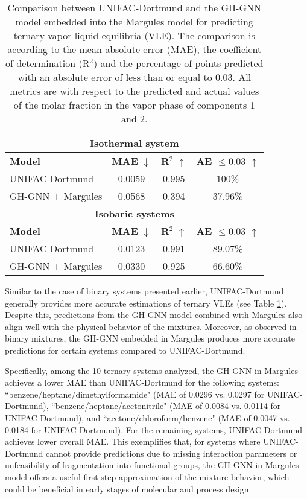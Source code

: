 \begin{table}[h]
\centering
  \caption{Comparison between UNIFAC-Dortmund and the GH-GNN model embedded into the Margules model for predicting ternary vapor-liquid equilibria (VLE). The comparison is according to the mean absolute error (MAE), the coefficient of determination (R$^2$) and the percentage of points predicted with an absolute error of less than or equal to 0.03. All metrics are with respect to the predicted and actual values of the molar fraction in the vapor phase of components 1 and 2.}
  \label{tbl:ternary}
  \small
  \begin{tabular*}{1\textwidth}{@{\extracolsep{\fill}}lccc}
    \hline
    \multicolumn{4}{c}{\textbf{Isothermal system}}\\
    \hline
    \textbf{Model} & \textbf{MAE} $\downarrow$ & \textbf{R$^2$} $\uparrow$ & \textbf{AE $\leq 0.03$} $\uparrow$ \\
    \hline
    UNIFAC-Dortmund & 0.0059 & 0.995 & 100\% \\
    GH-GNN + Margules & 0.0568 & 0.394 & 37.96\% \\
    \hline
    \multicolumn{4}{c}{\textbf{Isobaric systems}}\\
    \hline
    \textbf{Model} & \textbf{MAE} $\downarrow$ & \textbf{R$^2$} $\uparrow$ & \textbf{AE $\leq 0.03$} $\uparrow$ \\
    \hline
    UNIFAC-Dortmund & 0.0123 & 0.991 & 89.07\% \\
    GH-GNN + Margules & 0.0330 & 0.925 & 66.60\% \\
    \hline
  \end{tabular*}
\end{table}

Similar to the case of binary systems presented earlier, UNIFAC-Dortmund generally provides more accurate estimations of ternary VLEs (see Table \ref{tbl:ternary}). Despite this, predictions from the GH-GNN model combined with Margules also align well with the physical behavior of the mixtures. Moreover, as observed in binary mixtures, the GH-GNN embedded in Margules produces more accurate predictions for certain systems compared to UNIFAC-Dortmund.

Specifically, among the 10 ternary systems analyzed, the GH-GNN in Margules achieves a lower MAE than UNIFAC-Dortmund for the following systems: ``benzene/heptane/dimethylformamide" (MAE of 0.0296 vs. 0.0297 for UNIFAC-Dortmund), ``benzene/heptane/acetonitrile" (MAE of 0.0084 vs. 0.0114 for UNIFAC-Dortmund), and ``acetone/chloroform/benzene" (MAE of 0.0047 vs. 0.0184 for UNIFAC-Dortmund). For the remaining systems, UNIFAC-Dortmund achieves lower overall MAE. This exemplifies that, for systems where UNIFAC-Dortmund cannot provide predictions due to missing interaction parameters or unfeasibility of fragmentation into functional groups, the GH-GNN in Margules model offers a useful first-step approximation of the mixture behavior, which could be beneficial in early stages of molecular and process design.